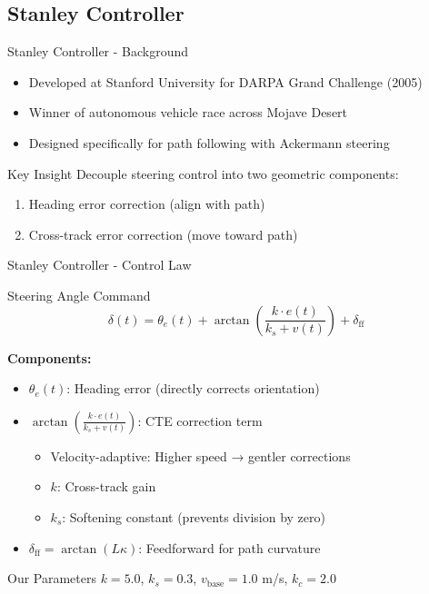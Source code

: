 \documentclass[10pt]{beamer}
\begin{document}
\subsection{Stanley Controller}

\begin{frame}{Stanley Controller - Background}
  \begin{itemize}
    \item Developed at Stanford University for DARPA Grand Challenge (2005)
    \item Winner of autonomous vehicle race across Mojave Desert
    \item Designed specifically for path following with Ackermann steering
  \end{itemize}

  \vspace{0.5cm}

  \begin{block}{Key Insight}
    Decouple steering control into two geometric components:
    \begin{enumerate}
      \item Heading error correction (align with path)
      \item Cross-track error correction (move toward path)
    \end{enumerate}
  \end{block}
\end{frame}

\begin{frame}{Stanley Controller - Control Law}
  \begin{block}{Steering Angle Command}
    $$\delta(t) = \theta_e(t) + \arctan\left(\frac{k \cdot e(t)}{k_s + v(t)}\right) + \delta_{\text{ff}}$$
  \end{block}

  \textbf{Components:}
  \begin{itemize}
    \item $\theta_e(t)$: Heading error (directly corrects orientation)
    \item $\arctan\left(\frac{k \cdot e(t)}{k_s + v(t)}\right)$: CTE correction term
    \begin{itemize}
      \item Velocity-adaptive: Higher speed → gentler corrections
      \item $k$: Cross-track gain
      \item $k_s$: Softening constant (prevents division by zero)
    \end{itemize}
    \item $\delta_{\text{ff}} = \arctan(L \kappa)$: Feedforward for path curvature
  \end{itemize}

  \vspace{0.3cm}

  \begin{block}{Our Parameters}
    $k = 5.0$, $k_s = 0.3$, $v_{\text{base}} = 1.0$ m/s, $k_c = 2.0$
  \end{block}
\end{frame}
\end{document}
